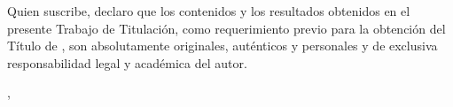 \clearpage
{}
Quien suscribe, declaro que los contenidos y los resultados obtenidos en el
presente Trabajo de Titulación, como requerimiento previo para la obtención del
Título de \TituloAObtener, son absolutamente originales, auténticos y
personales y de exclusiva responsabilidad legal y académica del autor.

\vspace{10mm}
\CiudadTexto, \FechaAprobacion

\vspace{22mm}
\lineafirma{\Autor\\\Cedula}

